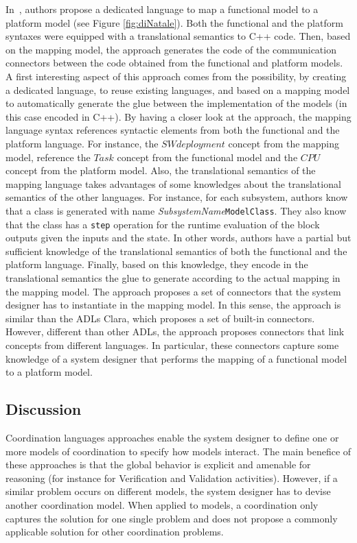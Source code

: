 In~\cite{dinatale}, authors propose a dedicated language to map a functional model to a platform model (see Figure \ref{fig:diNatale}). Both the functional and the platform syntaxes were equipped with a translational semantics to C++ code. Then, based on the mapping model, the approach generates the code of the communication connectors between the code obtained from the functional and platform models. A first interesting aspect of this approach comes from the possibility, by creating a dedicated language, to reuse existing languages, and based on a mapping model to automatically generate the glue between the implementation of the models (in this case encoded in C++). By having a closer look at the approach, the mapping language syntax references syntactic elements from both the functional and the platform language. For instance, the $SWdeployment$ concept from the mapping model, reference the $Task$ concept from the functional model and the $CPU$ concept from the platform model. Also, the translational semantics of the mapping language takes advantages of some knowledges about the translational semantics of the other languages. For instance, for each subsystem, authors know that a class is generated with name \emph{SubsystemName}\texttt{ModelClass}. They also know that the class has a \texttt{step} operation for the runtime evaluation of the block outputs given the inputs and the state. In other words, authors have a partial but sufficient knowledge of the translational semantics of both the functional and the platform language. Finally, based on this knowledge, they encode in the translational semantics the glue to generate according to the actual mapping in the mapping model. The approach proposes a set of connectors that the system designer has to instantiate in the mapping model. In this sense, the approach is similar than the ADLs Clara, which proposes a set of built-in connectors. However, different than other ADLs, the approach proposes connectors that link concepts from different languages. In particular, these connectors capture some knowledge of a system designer that performs the mapping of a functional model to a platform model.
         	
\subsection{Discussion}

Coordination languages approaches enable the system designer to define one or more models of coordination to specify how models interact. The main benefice of these approaches is that the global behavior is explicit and amenable for reasoning (for instance for Verification and Validation activities). However, if a similar problem occurs on different models, the system designer has to devise another coordination model. When applied to models, a coordination only captures the solution for one single problem and does not propose a commonly applicable solution for other coordination problems.
		
